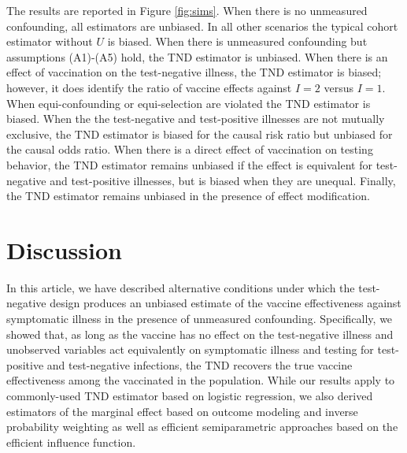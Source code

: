 \documentclass[11pt]{article}
\begin{document}
The results are reported in Figure \ref{fig:sims}. When there is no unmeasured confounding, all estimators are unbiased. In all other scenarios the typical cohort estimator without $U$ is biased. When there is unmeasured confounding but assumptions (A1)-(A5) hold, the TND estimator is unbiased. When there is an effect of vaccination on the test-negative illness, the TND estimator is biased; however, it does identify the ratio of vaccine effects against $I = 2$ versus $I = 1$. When equi-confounding or equi-selection are violated the TND estimator is biased. When the the test-negative and test-positive illnesses are not mutually exclusive, the TND estimator is biased for the causal risk ratio but unbiased for the causal odds ratio.  When there is a direct effect of vaccination on testing behavior, the TND estimator remains unbiased if the effect is equivalent for test-negative and test-positive illnesses, but is biased when they are unequal. Finally, the TND estimator remains unbiased in the presence of effect modification. %

\section{Discussion} \label{sec:discussion}

In this article, we have described alternative conditions under which the test-negative design produces an unbiased estimate of the vaccine effectiveness against symptomatic illness in the presence of unmeasured confounding. Specifically, we showed that, as long as the vaccine has no effect on the test-negative illness and unobserved variables act equivalently on symptomatic illness and testing for test-positive and test-negative infections, the TND recovers the true vaccine effectiveness among the vaccinated in the population. While our results apply to commonly-used TND estimator based on logistic regression, we also derived estimators of the marginal effect based on outcome modeling and inverse probability weighting as well as efficient semiparametric approaches based on the efficient influence function. 
\end{document}
